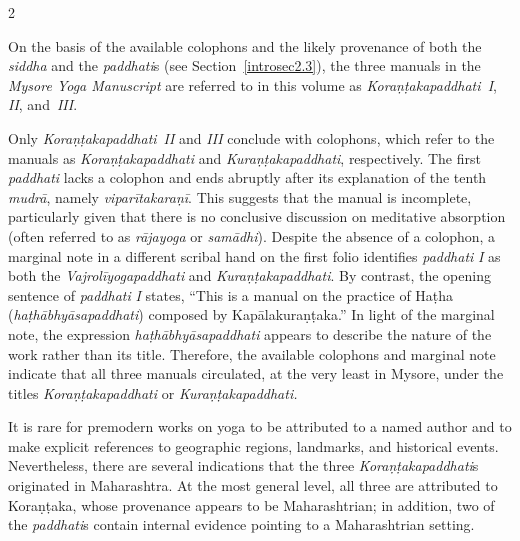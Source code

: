 \begin{nohyp}
\begin{multicols*}{2}
\begin{eng}
\label{introsec2.2}
\vskip 9pt

\noindent
On the basis of the available colophons and the likely provenance of both the \emph{siddha} and the \emph{paddhati}s (see Section~\ref{introsec2.3}), the three manuals in the \emph{Mysore Yoga Manuscript} are referred to in this volume as \emph{Koraṇṭakapaddhati~I}, \emph{II}, and~\emph{III}.

Only \emph{Koraṇṭakapaddhati}~\emph{II} and \emph{III} conclude with colophons, which refer to the manuals as \emph{Koraṇṭakapaddhati} and \emph{Kuraṇṭakapaddhati}, respectively. The first \emph{paddhati} lacks a colophon and ends abruptly after its explanation of the tenth \emph{mudrā}, namely \emph{viparītakaraṇī}. This suggests that the manual is incomplete, particularly given that there is no conclusive discussion on meditative absorption (often referred to as \emph{rājayoga} or \emph{samādhi}). Despite the absence of a colophon, a marginal note in a different scribal hand on the first folio identifies \emph{paddhati} \emph{I} as both the \emph{Vajrolīyogapaddhati} and \emph{Kuraṇṭakapaddhati}. By contrast, the opening sentence of \emph{paddhati} \emph{I} states, ``This is a manual on the practice of Haṭha (\emph{haṭhābhyāsapaddhati}) composed by Kapālakuraṇṭaka.'' In light of the marginal note, the expression \emph{haṭhābhyāsapaddhati} appears to describe the nature of the work rather than its title. Therefore, the available colophons and marginal note indicate that all three manuals circulated, at the very least in Mysore, under the titles \emph{Koraṇṭakapaddhati} or \emph{Kuraṇṭakapaddhati.}
\vskip 18pt

\label{introsec2.3}
\vskip 9pt

\noindent
It is rare for premodern works on yoga to be attributed to a named author and to make explicit references to geographic regions, landmarks, and historical events. Nevertheless, there are several indications that the three \emph{Koraṇṭakapaddhati}s originated in Maharashtra. At the most general level, all three are attributed to Koraṇṭaka, whose provenance appears to be Maharashtrian; in addition, two of the \emph{paddhati}s contain internal evidence pointing to a Maharashtrian setting.


\end{eng}
\end{multicols*}
\end{nohyp}
